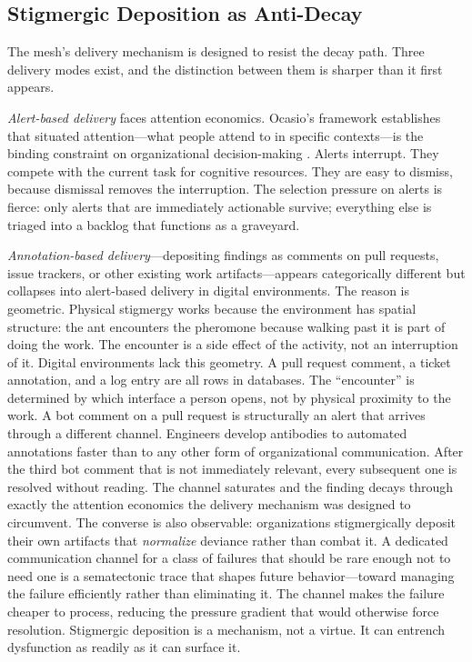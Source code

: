 \documentclass[11pt,a4paper]{article}
\begin{document}
\subsection{Stigmergic Deposition as Anti-Decay}
\label{sec:anti-decay}

The mesh's delivery mechanism is designed to resist the decay path. Three delivery modes exist, and the distinction between them is sharper than it first appears.

\emph{Alert-based delivery} faces attention economics. Ocasio's framework establishes that situated attention---what people attend to in specific contexts---is the binding constraint on organizational decision-making \citep{ocasio1997}. Alerts interrupt. They compete with the current task for cognitive resources. They are easy to dismiss, because dismissal removes the interruption. The selection pressure on alerts is fierce: only alerts that are immediately actionable survive; everything else is triaged into a backlog that functions as a graveyard.

\emph{Annotation-based delivery}---depositing findings as comments on pull requests, issue trackers, or other existing work artifacts---appears categorically different but collapses into alert-based delivery in digital environments. The reason is geometric. Physical stigmergy works because the environment has spatial structure: the ant encounters the pheromone because walking past it is part of doing the work. The encounter is a side effect of the activity, not an interruption of it. Digital environments lack this geometry. A pull request comment, a ticket annotation, and a log entry are all rows in databases. The ``encounter'' is determined by which interface a person opens, not by physical proximity to the work. A bot comment on a pull request is structurally an alert that arrives through a different channel. Engineers develop antibodies to automated annotations faster than to any other form of organizational communication. After the third bot comment that is not immediately relevant, every subsequent one is resolved without reading. The channel saturates and the finding decays through exactly the attention economics the delivery mechanism was designed to circumvent. The converse is also observable: organizations stigmergically deposit their own artifacts that \emph{normalize} deviance rather than combat it. A dedicated communication channel for a class of failures that should be rare enough not to need one is a sematectonic trace that shapes future behavior---toward managing the failure efficiently rather than eliminating it. The channel makes the failure cheaper to process, reducing the pressure gradient that would otherwise force resolution. Stigmergic deposition is a mechanism, not a virtue. It can entrench dysfunction as readily as it can surface it.
\end{document}
